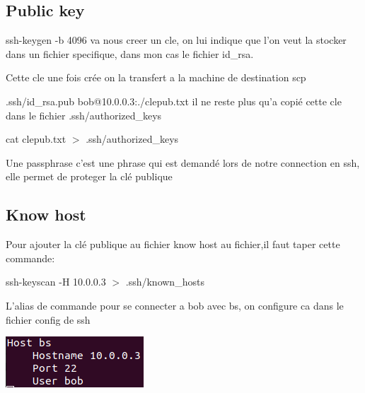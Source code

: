 \documentclass{article}
\begin{document}
 
 
 \subsection{\large{Public key}}
 
 ssh-keygen -b 4096 va nous creer un cle, on lui indique que l'on veut la stocker dans un fichier specifique, dans mon cas le fichier id\_rsa.\par 
 Cette cle une fois crée on la transfert a la machine de destination scp\par
 .ssh/id\_rsa.pub bob@10.0.0.3:./clepub.txt
 il ne reste plus qu'a copié cette cle dans le fichier .ssh/authorized\_keys \par
  cat clepub.txt $>$ .ssh/authorized\_keys
 \\\par
 Une passphrase c’est une phrase qui est demandé lors de notre connection en ssh, elle permet de proteger la clé publique

 
 
 \subsection{\large{Know host}}
 
 Pour ajouter la clé publique au fichier know host au fichier,il faut taper cette commande: \par
 ssh-keyscan -H 10.0.0.3 $>$ .ssh/known\_hosts
 \\\par
 L'alias de commande pour se connecter a bob avec bs, on configure ca dans le fichier config de ssh
 
 \begin{center}
        \includegraphics[scale=0.47]{Images/bs.png}
 \end{center}
 
\end{document}
